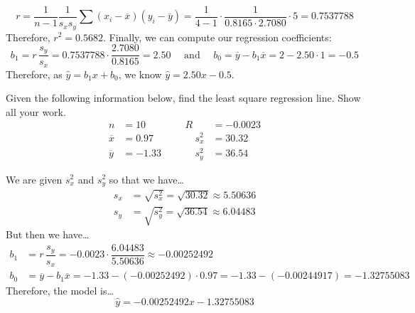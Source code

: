 \documentclass[11pt,letterpaper]{article}
\begin{document}
	\[
	r= \dfrac{1}{n - 1} \dfrac{1}{s_x s_y} \sum (x_i - \overline{x})(y_i - \overline{y})= \dfrac{1}{4 - 1} \cdot \dfrac{1}{0.8165 \cdot 2.7080} \cdot 5= 0.7537788
	\]
Therefore, $r^2= 0.5682$. Finally, we can compute our regression coefficients:
	\[
	b_1= r\, \dfrac{s_y}{s_x}= 0.7537788 \cdot \dfrac{2.7080}{0.8165}= 2.50 \quad \text{ and } \quad b_0= \overline{y} - b_1 \overline{x}= 2 - 2.50 \cdot 1= -0.5
	\]
Therefore, as $\widehat{y}= b_1x + b_0$, we know $\widehat{y}= 2.50x - 0.5$.  



\newpage



 Given the following information below, find the least square regression line. Show all your work. 
	\[
	\begin{aligned}
	n&= 10 &&& R&= -0.0023 \\
	\overline{x}&= 0.97 &&& \quad s_x^2&= 30.32 \\
	\overline{y}&= -1.33 &&& \quad s_y^2&= 36.54
	\end{aligned}
	\] \pspace

\sol We are given $s_x^2$ and $s_y^2$ so that we have\dots
	\[
	\begin{aligned}
	s_x&= \sqrt{s_x^2}= \sqrt{30.32} \approx 5.50636 \\[0.3cm]
	s_y&= \sqrt{s_y^2}= \sqrt{36.54} \approx 6.04483
	\end{aligned}
	\]
But then we have\dots
	\[
	\begin{aligned}
	b_1&= r \, \dfrac{s_y}{s_x}= -0.0023 \cdot \dfrac{6.04483}{5.50636} \approx -0.00252492 \\[0.3cm]
	b_0&= \overline{y} - b_1 \overline{x}= -1.33 - (-0.00252492) \cdot 0.97= -1.33 - (-0.00244917)= -1.32755083
	\end{aligned}
	\]
Therefore, the model is\dots
	\[
	\widehat{y}= -0.00252492x - 1.32755083
	\]



\newpage
\end{document}
